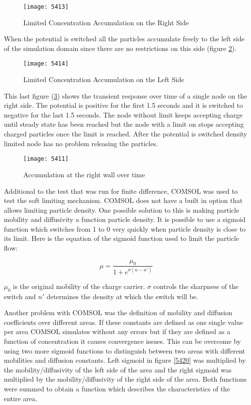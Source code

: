 \begin{doublespace}
\begin{figure}[!htp]
\centering
\texttt{[image: 5413]}
\caption{Limited Concentration Accumulation on the Right Side} 
\label{5413}
\end{figure}

When the potential is switched all the particles accumulate freely to the left side of the simulation domain since there are no restrictions on this side (figure \ref{5414}).
\begin{figure}[!htp]
\centering
\texttt{[image: 5414]}
\caption{Limited Concentration Accumulation on the Left Side} 
\label{5414}
\end{figure}

This last figure (\ref{5411}) shows the transient response over time of a single node on the right side. The potential is positive for the first 1.5 seconds and it is switched to negative for the last 1.5 seconds. The node without limit keeps accepting charge until steady state has been reached but the node with a limit on stops accepting charged particles once the limit is reached. After the potential is switched density limited node has no problem releasing the particles.


\begin{figure}[!htp]
\centering
\texttt{[image: 5411]}
\caption{Accumulation at the right wall over time} 
\label{5411}
\end{figure}

Additional to the test that was run for finite difference, COMSOL was used to test the soft limiting mechanism. COMSOL does not have a built in option that allows limiting particle density. One possible solution to this is making particle mobility and diffusivity a function particle density. It is possible to use a sigmoid function which switches from 1 to 0 very quickly when particle density is close to its limit. Here is the equation of the sigmoid function used to limit the particle flow:

\begin{equation}
\mu = \frac{\mu_{0}}{1+e^{\sigma(n-n')}}
\label{mur}
\end{equation} 

$\mu_0$ is the original mobility of the charge carrier. $\sigma$ controls the sharpness of the switch and $n'$ determines the density at which the switch will be. 

Another problem with COMSOL was the definition of mobility and diffusion coefficients over different areas. If these constants are defined as one single value per area COMSOL simulates without any errors but if they are defined as a function of concentration it causes convergence issues. This can be overcome by using two more sigmoid functions to distinguish between two areas with different mobilities and diffusion constants. Left sigmoid in figure \ref{5420}  was multiplied by the mobility/diffusivity of the left side of the area and the right sigmoid was multiplied by the mobility/diffusivity of the right side of the area. Both functions were summed to obtain a function which describes the characteristics of the entire area.


\end{doublespace}
